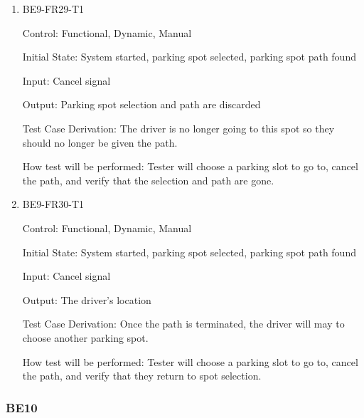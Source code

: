 \documentclass[12pt, titlepage]{article}
\begin{document}
\begin{enumerate}

    \item{BE9-FR29-T1}

    Control: Functional, Dynamic, Manual
    					
    Initial State: System started, parking spot selected, parking spot path
    found
    					
    Input: Cancel signal
    					
    Output: Parking spot selection and path are discarded
    
    Test Case Derivation: The driver is no longer going to this spot so they
    should no longer be given the path.
    					
    How test will be performed: Tester will choose a parking slot to go to,
    cancel the path, and verify that the selection and path are gone.

    \item{BE9-FR30-T1}

    Control: Functional, Dynamic, Manual
    					
    Initial State: System started, parking spot selected, parking spot path
    found
    					
    Input: Cancel signal
    					
    Output: The driver's location
    
    Test Case Derivation: Once the path is terminated, the driver will may to
    choose another parking spot.
    					
    How test will be performed: Tester will choose a parking slot to go to,
    cancel the path, and verify that they return to spot selection.

\end{enumerate}

\subsubsection{BE10}
\end{document}
